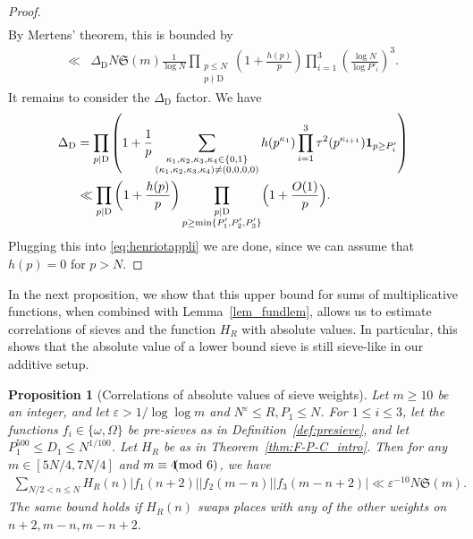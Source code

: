 \documentclass[12pt]{amsart}
\newtheorem{proposition}[theorem]{Proposition}
\theoremstyle{definition}
\theoremstyle{remark}
\numberwithin{equation}{section}
\newcommand{\1}{\mathbf{1}}
\let\oldpmod\pmod
\renewcommand{\pmod}[1]{\hspace{-0.12cm}\oldpmod {#1}}
\begin{document}
\begin{proof}
\begin{align*}
    \end{align*}
    By Mertens' theorem, this is bounded by
    \begin{align}\label{eq:henriotappli}
        	\ll& \Delta_\mathrm{D} N \mathfrak{S}(m)  \frac{1}{\log  N}  \prod_{\substack{p\leq N\\ p\nmid \mathrm{D}}} \left(1+\frac{h(p)}{p}\right) \prod_{i=1}^3 \left(\frac{\log N}{\log P'_i}\right)^3.
    \end{align}
        It remains to consider the $\Delta_\mathrm{D}$ factor. We have
	\begin{align*}
		\Delta_\mathrm{D}&=\prod_{p\mid \mathrm{D}}\left(1+\frac{1}{p}\sum_{\substack{\kappa_1,\kappa_2,\kappa_3,\kappa_4\in \{0,1\}\\ (\kappa_1,\kappa_2,\kappa_3,\kappa_4)\neq (0,0,0,0)}}h(p^{\kappa_1})\prod_{i=1}^3 \tau^2(p^{\kappa_{i+1}})\1_{p\geq P'_i}\right)\\
		&\ll \prod_{p\mid \mathrm{D}}\left(1+\frac{h(p)}{p}\right)\prod_{\substack{p\mid \mathrm{D}\\p\geq \min\{P_1',P_2',P_3'\}}}\Bigl(1+\frac{O(1)}{p}\Bigr).
	\end{align*}
    Plugging this into \eqref{eq:henriotappli} we are done, since we can assume that $h(p)=0$ for $p>N$.
\end{proof}

    

In the next proposition, we show that this upper bound for sums of multiplicative functions, when combined with Lemma~\ref{lem_fundlem}, allows us to estimate correlations of sieves and the function $H_R$ with absolute values. In particular, this shows that the absolute value of a lower bound sieve is still sieve-like in our additive setup.




\begin{proposition}[Correlations of absolute values of sieve weights]\label{prop:LambdaQ}
    Let $m\geq 10$ be an integer, and let $\varepsilon>1/\log \log m$ and $N^\varepsilon \leq R, P_1\leq N$. For $1\leq i \leq 3$, let the functions $f_i\in \{ \omega, \Omega \}$ be pre-sieves as in Definition~\ref{def:presieve}, and let $P_1^{500}\leq D_1\leq N^{1/100}$. Let $H_R$ be as in Theorem~\ref{thm:F-P-C_intro}. Then for any $m\in [5N/4,7N/4]$ and $m \equiv 4\pmod 6$, we have
	\begin{align*}
		\sum_{N/2<n\leq N}H_R(n) |f_
		1(n+2)||f_2(m-n)||f_3(m-n+2)|\ll \varepsilon^{-10}N\mathfrak{S}(m).
    \end{align*}
    The same bound holds if $H_R(n)$ swaps places with any of the other weights on $n+2,m-n,m-n+2$.
\end{proposition}
\end{document}
